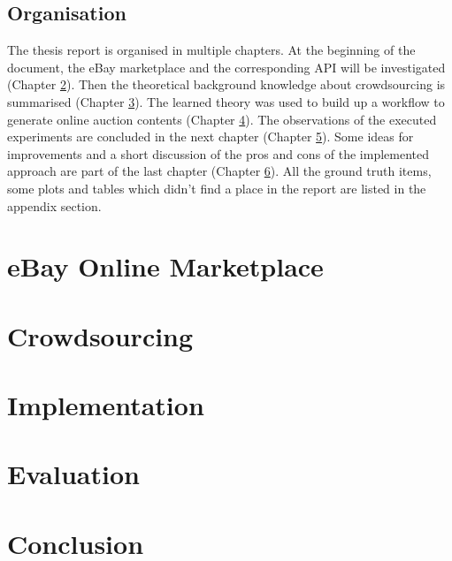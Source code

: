 \documentclass[a4paper]{report}
\begin{document}
\section{Organisation}
The thesis report is organised in multiple chapters. At the beginning of the document, the eBay marketplace and the corresponding API will be investigated (Chapter \ref{chap:ebay}). Then the theoretical background knowledge about crowdsourcing is summarised (Chapter \ref{chap:crowdsourcing}). The learned theory was used to build up a workflow to generate online auction contents (Chapter \ref{chap:implementation}). The observations of the executed experiments are concluded in the next chapter (Chapter \ref{chap:evaluation}). Some ideas for improvements and a short discussion of the pros and cons of the implemented approach are part of the last chapter (Chapter \ref{chap:conclusion}). All the ground truth items, some plots and tables which didn't find a place in the report are listed in the appendix section.

\chapter{eBay Online Marketplace}
\label{chap:ebay}


\chapter{Crowdsourcing}
\label{chap:crowdsourcing}


\chapter{Implementation}
\label{chap:implementation}


\chapter{Evaluation}
\label{chap:evaluation}


\chapter{Conclusion}
\label{chap:conclusion}


\clearpage



\newpage
\begin{appendices}

\end{appendices}
\end{document}
